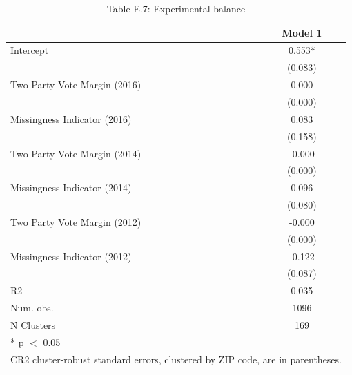 \begin{table}
\centering
\caption{Table E.7: Experimental balance}
\centering
\begin{tabular}[t]{lc}
\toprule
  & Model 1\\
\midrule
Intercept & 0.553*\\
 & (0.083)\\
Two Party Vote Margin (2016) & 0.000\\
 & \vphantom{2} (0.000)\\
Missingness Indicator (2016) & 0.083\\
 & (0.158)\\
Two Party Vote Margin (2014) & -0.000\\
 & \vphantom{1} (0.000)\\
Missingness Indicator (2014) & 0.096\\
 & (0.080)\\
Two Party Vote Margin (2012) & -0.000\\
 & (0.000)\\
Missingness Indicator (2012) & -0.122\\
 & (0.087)\\
\midrule
R2 & 0.035\\
Num. obs. & 1096\\
N Clusters & 169\\
\bottomrule
\multicolumn{2}{l}{\rule{0pt}{1em}* p $<$ 0.05}\\
\multicolumn{2}{l}{\rule{0pt}{1em}CR2 cluster-robust standard errors, clustered by ZIP code, are in parentheses.}\\
\end{tabular}
\end{table}

